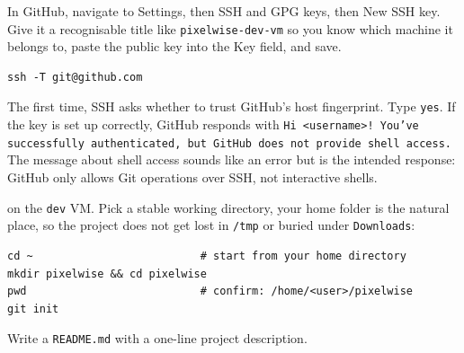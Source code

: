 In GitHub, navigate to Settings, then SSH and GPG keys, then New SSH key. Give it a
recognisable title like \texttt{pixelwise-dev-vm} so you know which machine it belongs to,
paste the public key into the Key field, and save.




\begin{verbatim}
ssh -T git@github.com
\end{verbatim}

The first time, SSH asks whether to trust GitHub's host fingerprint. Type \texttt{yes}.
If the key is set up correctly, GitHub responds with
\texttt{Hi <username>! You've successfully authenticated, but GitHub does not provide shell access.}
The message about shell access sounds like an error but is the intended response: GitHub
only allows Git operations over SSH, not interactive shells.

 on the \texttt{dev} VM. Pick a stable working
directory, your home folder is the natural place, so the project does not get lost in
\texttt{/tmp} or buried under \texttt{Downloads}:


\begin{verbatim}
cd ~                          # start from your home directory
mkdir pixelwise && cd pixelwise
pwd                           # confirm: /home/<user>/pixelwise
git init
\end{verbatim}

Write a \texttt{README.md} with a one-line project description.


\newpage
